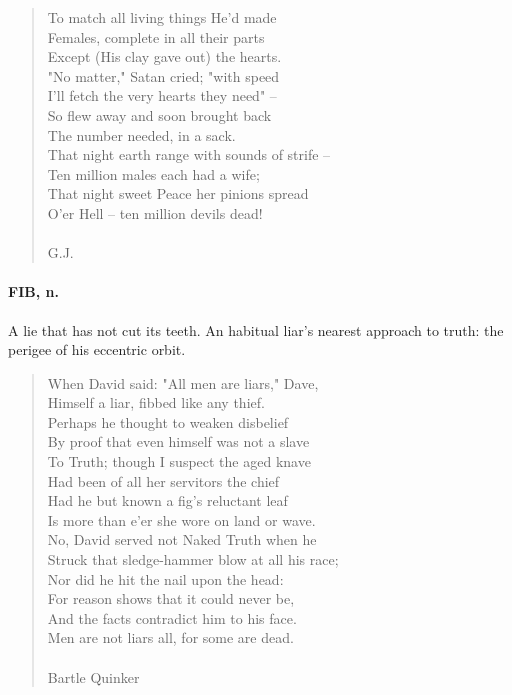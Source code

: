 \documentclass[11pt]{article}
\begin{document}
\begin{quote}
  To match all living things He'd made \\
  Females, complete in all their parts \\
  Except (His clay gave out) the hearts. \\
  "No matter," Satan cried; "with speed \\
  I'll fetch the very hearts they need" -- \\
  So flew away and soon brought back \\
  The number needed, in a sack. \\
  That night earth range with sounds of strife -- \\
  Ten million males each had a wife; \\
  That night sweet Peace her pinions spread \\
  O'er Hell -- ten million devils dead! \\
 \\
G.J. \end{quote}


\paragraph{FIB, n.}  A lie that has not cut its teeth.  An habitual liar's nearest
approach to truth:  the perigee of his eccentric orbit.

\begin{quote}   When David said:  "All men are liars," Dave, \\
      Himself a liar, fibbed like any thief. \\
      Perhaps he thought to weaken disbelief \\
  By proof that even himself was not a slave \\
  To Truth; though I suspect the aged knave \\
      Had been of all her servitors the chief \\
      Had he but known a fig's reluctant leaf \\
  Is more than e'er she wore on land or wave. \\
  No, David served not Naked Truth when he \\
      Struck that sledge-hammer blow at all his race; \\
          Nor did he hit the nail upon the head: \\
  For reason shows that it could never be, \\
      And the facts contradict him to his face. \\
          Men are not liars all, for some are dead. \\
 \\
Bartle Quinker \end{quote}
\end{document}
